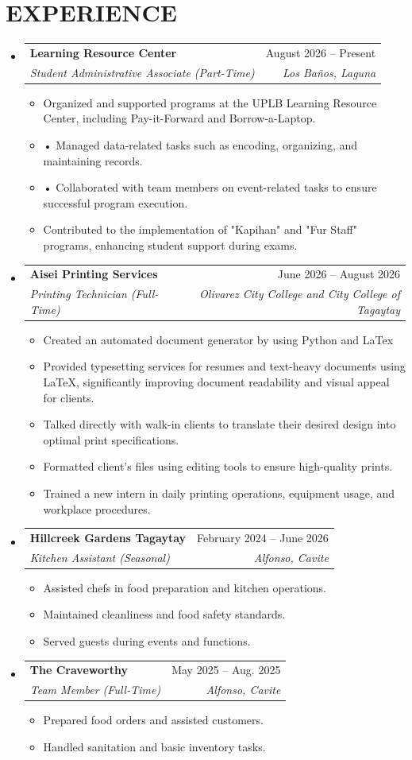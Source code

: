 \documentclass[letterpaper,11pt]{article}
\makeatletter
\newcommand{\resumeItem}[1]{
  \item \small{#1}
}
\newcommand{\resumeSubheading}[4]{
\item
\begin{tabular*}{\textwidth}{l@{\extracolsep{\fill}}r}
\textbf{#1} & {\small #2} \\
\textit{#3} & \textit{\small #4} \\
\end{tabular*}
}
\makeatother
\begin{document}
\section{EXPERIENCE}
\begin{itemize}[leftmargin=0in, label={}]


\resumeSubheading
{Learning Resource Center}{August 2026 -- Present}
{Student Administrative Associate (Part-Time)}{Los Baños, Laguna}
\begin{itemize}
\resumeItem{Organized and supported programs at the UPLB Learning Resource Center, including Pay-it-Forward and Borrow-a-Laptop. }
\resumeItem{• Managed data-related tasks such as encoding, organizing, and maintaining records.}
\resumeItem{• Collaborated with team members on event-related tasks to ensure successful program execution. }
\resumeItem{Contributed to the implementation of "Kapihan" and "Fur Staff" programs, enhancing student support during exams.}
\end{itemize}





\resumeSubheading
{Aisei Printing Services}{June 2026 -- August 2026}
{Printing Technician (Full-Time)}{Olivarez City College and City College of Tagaytay}
\begin{itemize}
\resumeItem{Created an automated document generator by using Python and LaTex}
\resumeItem{Provided typesetting services for resumes and text-heavy documents using LaTeX, significantly improving document readability and visual appeal for clients.}
\resumeItem{Talked directly with walk-in clients to translate their desired design into optimal print specifications.}
\resumeItem{Formatted client's files using editing tools to ensure high-quality prints.}
\resumeItem{Trained a new intern in daily printing operations, equipment usage, and workplace procedures.}
\end{itemize}


\resumeSubheading
{Hillcreek Gardens Tagaytay}{February 2024 -- June 2026}
{Kitchen Assistant (Seasonal)}{Alfonso, Cavite}
\begin{itemize}
\resumeItem{Assisted chefs in food preparation and kitchen operations.}
\resumeItem{Maintained cleanliness and food safety standards.}
\resumeItem{Served guests during events and functions.}
\end{itemize}

\resumeSubheading
{The Craveworthy}{May 2025 -- Aug. 2025}
{Team Member (Full-Time)}{Alfonso, Cavite}
\begin{itemize}
\resumeItem{Prepared food orders and assisted customers.}
\resumeItem{Handled sanitation and basic inventory tasks.}
\end{itemize}

\end{itemize}
\vspace{-5pt}
\end{document}
